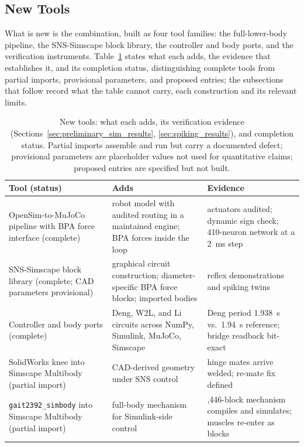 \subsection{New Tools}\label{sec:sns_new_tools}

What is new is the combination, built as four tool families: the full-lower-body pipeline, the SNS-Simscape block library, the controller and body ports, and the verification instruments. Table~\ref{tab:sns_capability} states what each adds, the evidence that establishes it, and its completion status, distinguishing complete tools from partial imports, provisional parameters, and proposed entries; the subsections that follow record what the table cannot carry, each construction and its relevant limits.

\begin{table}[htbp]
\caption{New tools: what each adds, its verification evidence (Sections~\ref{sec:preliminary_sim_results}, \ref{sec:spiking_results}), and completion status. Partial imports assemble and run but carry a documented defect; provisional parameters are placeholder values not used for quantitative claims; proposed entries are specified but not built.}
\label{tab:sns_capability}
\small
\begin{tabularx}{\textwidth}{@{}>{\raggedright\arraybackslash}p{}>{\raggedright\arraybackslash}p{}>{\raggedright\arraybackslash}X@{}}
\toprule
\textbf{Tool (status)} & \textbf{Adds} & \textbf{Evidence} \\
\midrule
OpenSim-to-MuJoCo pipeline with BPA force interface (complete) & robot model with audited routing in a maintained engine; BPA forces inside the loop & 92 actuators audited; dynamic sign check; 410-neuron network at a \qty{2}{\milli\second} step \\
SNS-Simscape block library (complete; CAD parameters provisional) & graphical circuit construction; diameter-specific BPA force blocks; imported bodies & reflex demonstrations and spiking twins \\
Controller and body ports (complete) & Deng, W2L, and Li circuits across NumPy, Simulink, MuJoCo, Simscape & Deng period \qty{1.938}{\second} vs.\ \qty{1.94}{\second} reference; bridge readback bit-exact \\
SolidWorks knee into Simscape Multibody (partial import) & CAD-derived geometry under SNS control & hinge mates arrive welded; re-mate fix defined \\
\texttt{gait2392\_simbody} into Simscape Multibody (partial import) & full-body mechanism for Simulink-side control & 1,446-block mechanism compiles and simulates; muscles re-enter as blocks \\

\end{tabularx}
\end{table}
